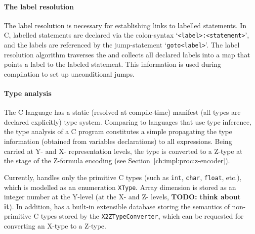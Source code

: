 

\paragraph{The label resolution}
\label{ch:impl:proc:x-pre-compiler:label}


The label resolution is necessary for establishing links to labelled statements. %
In C, labelled statements are declared via the colon-syntax `\texttt{<label>\;:\;<statement>}', and the labels are referenced by the jump-statement `\texttt{goto\;<label>}'.
The label resolution algorithm traverses the \ytree{} and collects all declared labels into a map that points a label to the labeled statement. %
This information is used during compilation to set up unconditional jumps.


\paragraph{Type analysis}
\label{ch:impl:proc:x-pre-compiler:type}

The C language has a static (resolved at compile-time) manifest (all types are declared explicitly) type system.
Comparing to languages that use type inference, the type analysis of a C program constitutes a simple propagating the type information (obtained from variables declarations) to all expressions. %
Being carried at Y- and X- representation levels, the type is converted to a Z-type at the stage of the Z-formula encoding (see Section~\ref{ch:impl:proc:z-encoder}).

Currently, \porthos[2] handles only the primitive C types (such as \texttt{int}, \texttt{char}, \texttt{float}, etc.), which is modelled as an enumeration \texttt{XType}. %
Array dimension is stored as an integer number at the Y-level (at the X- and Z- levels, \textbf{TODO: think about it}). %
In addition, \porthos[2] has a built-in extensible database storing the semantics of non-primitive C types stored by the \texttt{X2ZTypeConverter}, %
which can be requested for converting an X-type to a Z-type. %


